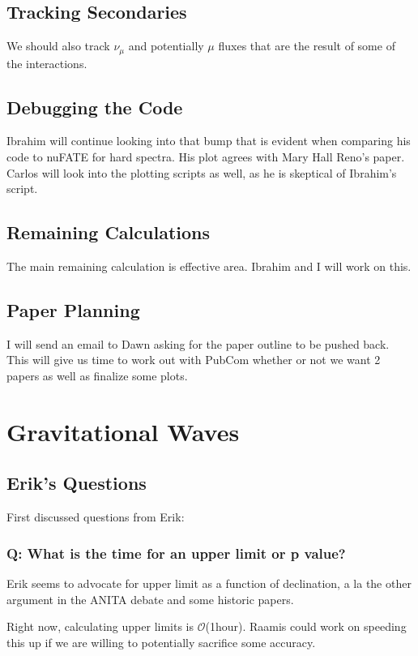 \subsection*{\textbf{Tracking Secondaries}}
We should also track $\nu_{\mu}$ and potentially $\mu$ fluxes that are the result of some of the interactions. 

\subsection*{\textbf{Debugging the Code}}
Ibrahim will continue looking into that bump that is evident when comparing his code to nuFATE for hard spectra. His plot agrees with Mary Hall Reno's paper. Carlos will look into the plotting scripts as well, as he is skeptical of Ibrahim's script. 

\subsection*{\textbf{Remaining Calculations}}
The main remaining calculation is effective area. Ibrahim and I will work on this. 

\subsection*{\textbf{Paper Planning}}
I will send an email to Dawn asking for the paper outline to be pushed back. This will give us time to work out with PubCom whether or not we want 2 papers as well as finalize some plots.  

\section{Gravitational Waves}
\label{GW}

\subsection{\textbf{Erik's Questions}}
First discussed questions from Erik:

\subsubsection{Q: What is the time for an upper limit or p value?}

Erik seems to advocate for upper limit as a function of declination, a la the other argument in the ANITA debate and some historic papers. 

Right now, calculating upper limits is $\mathcal{O}$(1hour). Raamis could work on speeding this up if we are willing to potentially sacrifice some accuracy.

